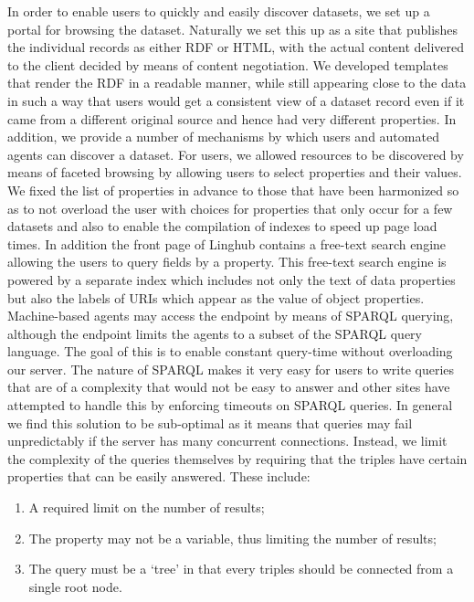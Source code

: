 \documentclass{acm_proc_article-sp}
\begin{document}
In order to enable users to quickly and easily discover datasets, we set up a 
portal for browsing the dataset. Naturally we set this up as a site that publishes
the individual records as either RDF or HTML, with the actual content delivered
to the client decided by means of content negotiation. We developed 
templates that render the RDF in a readable manner, while still appearing close
to the data in such a way that users would get a consistent view of a dataset record even
if it came from a different original source and hence had very different
properties.
In addition, we provide a 
number of mechanisms by which users and automated agents can discover a dataset.
For users, we allowed resources to be discovered by means of faceted browsing by
allowing users to select properties and their values. We fixed the list of
properties in advance to those that have been harmonized so as to not overload
the user with choices for properties that only occur for a few datasets and also
to enable the compilation of indexes to speed up page load times. In addition the
front page of Linghub contains a free-text search engine allowing the users to
query fields by a property. This free-text search engine is powered by a
separate index which includes not only the text of data properties but also the
labels of URIs which appear as the value of object properties. 
Machine-based agents may access
the endpoint by means of SPARQL querying, although the endpoint limits the agents
to a subset of the SPARQL query language. The goal of this is to enable constant
query-time without overloading our server. The nature of SPARQL makes it very
easy for users to write queries that are of a complexity that would not be easy
to answer and other sites have attempted to handle this by enforcing timeouts on
SPARQL queries. In general we find this solution to be sub-optimal as it
means that queries may fail unpredictably if the server has many concurrent
connections. Instead, we limit the complexity of the queries themselves by
requiring that the triples have certain properties that can be easily answered.
These include:

\begin{enumerate}
    \item A required limit on the number of results;
    \item The property may not be a variable, thus limiting the number of
        results;
    \item The query must be a `tree' in that every triples should be connected
        from a single root node.
\end{enumerate}
\end{document}
